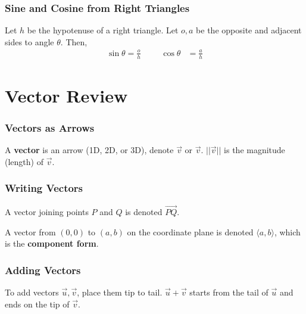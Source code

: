 \documentclass[20pt]{beamer}
\begin{document}
\begin{frame}
	\frametitle{Sine and Cosine from Right Triangles}
	\begin{figure}[ht]
		\centering
		\label{fig:sicostriangle}
	\end{figure}
	\begin{theorem}
		Let $h$ be the hypotenuse of a right triangle.
		Let $o, a$  be the opposite and adjacent sides to angle $\theta$.
		Then,
		\begin{align*}
			\sin \theta = \frac{o}{h} \hspace{1cm} \cos \theta & = \frac{a}{h}
		\end{align*}
	\end{theorem}
\end{frame}

\section{Vector Review}
\begin{frame}
	\frametitle{Vectors as Arrows}
	\begin{figure}[ht]
		\centering
		\label{fig:vectorarrow}
	\end{figure}
	\begin{definition}
		A \textbf{vector} is an arrow (1D, 2D, or 3D), denote $\vec{v}$ or $\overrightarrow{v}$. $||\vec{v}||$ is the magnitude (length) of $\vec{v}$.
	\end{definition}
\end{frame}

\begin{frame}
	\frametitle{Writing Vectors}
	\begin{figure}[ht]
		\centering
		\label{fig:vectornotation}
	\end{figure}
	\begin{definition}
		A vector joining points $P$ and $Q$ is denoted $\overrightarrow{PQ}$.

		A vector from $(0, 0)$ to $(a, b)$ on the coordinate plane is denoted $\langle a, b \rangle$, which is the \textbf{component form}.
	\end{definition}
\end{frame}

\begin{frame}
	\frametitle{Adding Vectors}
	\begin{figure}[ht]
		\centering
		\label{fig:vectoraddition}
	\end{figure}
	\begin{definition}
		To add vectors $\vec{u}, \vec{v}$, place them tip to tail. $\vec{u} + \vec{v}$ starts from the tail of $\vec{u}$ and ends on the tip of $\vec{v}$.
	\end{definition}
\end{frame}
\end{document}

